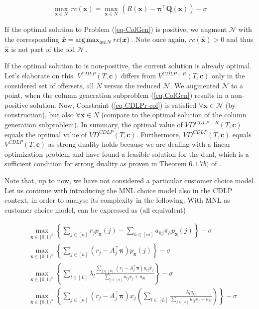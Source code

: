 \begin{align}
	\max_{\boldsymbol{x} \in N}\, rc(\boldsymbol{x}) = \max_{\boldsymbol{x} \in N}\, \left(R(\boldsymbol{x}) - \boldsymbol{\pi}^\intercal \boldsymbol{Q}(\boldsymbol{x})\right) - \sigma \label{eq-ColGen}
\end{align}

If the optimal solution to Problem (\ref{eq-ColGen}) is positive, we augment $\mathcal{N}$ with the corresponding $\hat{\boldsymbol{x}} = \operatorname*{arg\,max}_{\boldsymbol{x} \in N} rc(\boldsymbol{x})$\,. Note once again, $rc(\hat{\boldsymbol{x}}) > 0$ and thus $\hat{\boldsymbol{x}}$ is not part of the old $\mathcal{N}$\,. 

If the optimal solution to  is non-positive, the current solution is already optimal. Let's elaborate on this. $V^{CDLP}(T, \boldsymbol{c})$ differs from $V^{CDLP-R}(T, \boldsymbol{c})$ only in the considered set of offersets, all $N$ versus the reduced $\mathcal{N}$. We augmented $\mathcal{N}$ to a point, when the column generation subproblem (\ref{eq-ColGen}) results in a non-positive solution. Now, Constraint (\ref{eq-CDLPr-col}) is satisfied $\forall \boldsymbol{x} \in \mathcal{N}$ (by construction), but also $\forall \boldsymbol{x} \in N$ (compare to the optimal solution of the column generation subproblem). In summary, the optimal value of $VD^{CDLP-R}(T, \boldsymbol{c})$ equals the optimal value of $VD^{CDLP}(T, \boldsymbol{c})$. Furthermore, $VD^{CDLP}(T, \boldsymbol{c})$ equals $V^{CDLP}(T, \boldsymbol{c})$ as strong duality holds because we are dealing with a linear optimization problem and have found a feasible solution for the dual, which is a sufficient condition for strong duality as proven in Theorem $6.1.7 b)$ of \cite{Gritzmann.2013}.

Note that, up to now, we have not considered a particular customer choice model. Let us continue with introducing the MNL choice model also in the CDLP context, in order to analyse its complexity in the following. With MNL as customer choice model,   can be expressed as (all equivalent)

\begin{align}
&\max_{\boldsymbol{x} \in \{0, 1\}^n}\left\{ \sum_{j \in [n]} r_j p_{\boldsymbol{x}}(j) - \sum_{h \in [m]} a_{hj} \pi_h p_{\boldsymbol{x}}(j) \right\} - \sigma\\
&\max_{\boldsymbol{x} \in \{0, 1\}^n}\left\{ \sum_{j \in [n]} \left(r_j  - A_j^\intercal\boldsymbol{\pi}\right) p_{\boldsymbol{x}}(j) \right\} - \sigma\\
&\max_{\boldsymbol{x} \in \{0, 1\}^n}\left\{ \sum_{l \in [L]} \lambda_l \frac{\sum_{j \in [n]} \left(r_j  - A_j^\intercal\boldsymbol{\pi}\right)u_{lj}x_j}{\sum_{j \in [n]} u_{lj}x_j + u_{l0}} \right\} - \sigma\\
&\max_{\boldsymbol{x} \in \{0, 1\}^n}\left\{ \sum_{j \in [n]} \left(r_j  - A_j^\intercal\boldsymbol{\pi}\right) x_j \left( \sum_{l \in [L]} \frac{\lambda_l u_{lj} }{\sum_{j \in [n]} u_{lj}x_j + u_{l0}} \right)\right\} - \sigma\label{eq-ColGen-sub}
\end{align}

